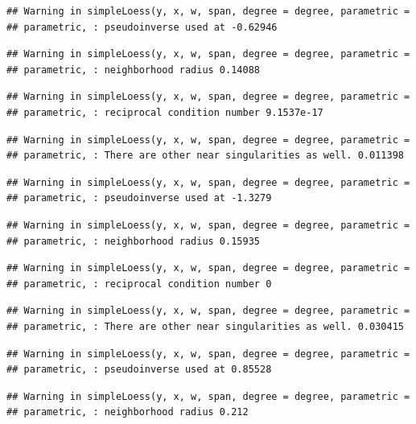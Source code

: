 \documentclass[]{article}
\begin{document}
\begin{verbatim}
## Warning in simpleLoess(y, x, w, span, degree = degree, parametric =
## parametric, : pseudoinverse used at -0.62946
\end{verbatim}

\begin{verbatim}
## Warning in simpleLoess(y, x, w, span, degree = degree, parametric =
## parametric, : neighborhood radius 0.14088
\end{verbatim}

\begin{verbatim}
## Warning in simpleLoess(y, x, w, span, degree = degree, parametric =
## parametric, : reciprocal condition number 9.1537e-17
\end{verbatim}

\begin{verbatim}
## Warning in simpleLoess(y, x, w, span, degree = degree, parametric =
## parametric, : There are other near singularities as well. 0.011398
\end{verbatim}

\begin{verbatim}
## Warning in simpleLoess(y, x, w, span, degree = degree, parametric =
## parametric, : pseudoinverse used at -1.3279
\end{verbatim}

\begin{verbatim}
## Warning in simpleLoess(y, x, w, span, degree = degree, parametric =
## parametric, : neighborhood radius 0.15935
\end{verbatim}

\begin{verbatim}
## Warning in simpleLoess(y, x, w, span, degree = degree, parametric =
## parametric, : reciprocal condition number 0
\end{verbatim}

\begin{verbatim}
## Warning in simpleLoess(y, x, w, span, degree = degree, parametric =
## parametric, : There are other near singularities as well. 0.030415
\end{verbatim}

\begin{verbatim}
## Warning in simpleLoess(y, x, w, span, degree = degree, parametric =
## parametric, : pseudoinverse used at 0.85528
\end{verbatim}

\begin{verbatim}
## Warning in simpleLoess(y, x, w, span, degree = degree, parametric =
## parametric, : neighborhood radius 0.212
\end{verbatim}
\end{document}
